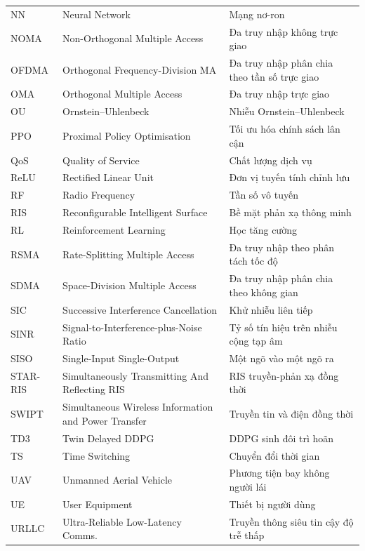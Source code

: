 \begin{longtable}{p{2cm} p{7cm} p{5.5cm}}
NN   & Neural Network                         & Mạng nơ-ron \\
NOMA & Non-Orthogonal Multiple Access         & Đa truy nhập không trực giao \\
OFDMA & Orthogonal Frequency-Division MA      & Đa truy nhập phân chia theo tần số trực giao \\
OMA  & Orthogonal Multiple Access             & Đa truy nhập trực giao \\
OU   & Ornstein--Uhlenbeck                    & Nhiễu Ornstein--Uhlenbeck \\
PPO  & Proximal Policy Optimisation           & Tối ưu hóa chính sách lân cận \\
QoS  & Quality of Service                     & Chất lượng dịch vụ \\
ReLU & Rectified Linear Unit                  & Đơn vị tuyến tính chỉnh lưu \\
RF   & Radio Frequency                        & Tần số vô tuyến \\
RIS  & Reconfigurable Intelligent Surface     & Bề mặt phản xạ thông minh \\
RL   & Reinforcement Learning                 & Học tăng cường \\
RSMA & Rate-Splitting Multiple Access         & Đa truy nhập theo phân tách tốc độ \\
SDMA & Space-Division Multiple Access         & Đa truy nhập phân chia theo không gian \\
SIC  & Successive Interference Cancellation   & Khử nhiễu liên tiếp \\
SINR & Signal-to-Interference-plus-Noise Ratio & Tỷ số tín hiệu trên nhiễu cộng tạp âm \\
SISO & Single-Input Single-Output             & Một ngõ vào một ngõ ra \\
STAR-RIS & Simultaneously Transmitting And Reflecting RIS & RIS truyền-phản xạ đồng thời \\
SWIPT & Simultaneous Wireless Information and Power Transfer & Truyền tin và điện đồng thời \\
TD3  & Twin Delayed DDPG                      & DDPG sinh đôi trì hoãn \\
TS   & Time Switching                         & Chuyển đổi thời gian \\
UAV  & Unmanned Aerial Vehicle                & Phương tiện bay không người lái \\
UE   & User Equipment                         & Thiết bị người dùng \\
URLLC & Ultra-Reliable Low-Latency Comms.     & Truyền thông siêu tin cậy độ trễ thấp \\
\bottomrule
\end{longtable}

\clearpage
\thispagestyle{empty}
\renewcommand{\listtablename}{\hfill DANH MỤC CÁC BẢNG \hfill}
\listoftables

\clearpage
\thispagestyle{empty}
\renewcommand{\listfigurename}{\hfill DANH MỤC CÁC HÌNH ẢNH \hfill}
\listoffigures
